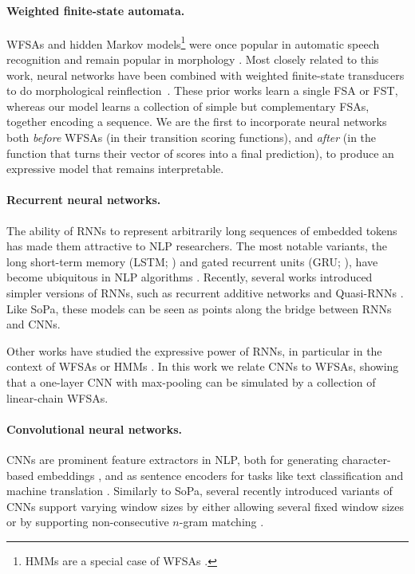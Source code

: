 \documentclass[11pt,a4paper]{article}
\renewcommand{\cite}[1]{\citep{#1}}
\newcommand{\interalia}[1]{\citep{#1}} %
\newcommand{\SoftP}{SoPa\xspace}
\begin{document}
\paragraph{Weighted finite-state automata.} WFSAs and hidden Markov models\footnote{HMMs are a special case of  WFSAs \cite{Mohri:2002}.} were once popular in
automatic speech recognition \interalia{hetherington_mit_2004,moore_juicer_2006,hoffmeister_wfst_2012} and
remain popular in morphology \interalia{dreyer_non-parametric_2011,cotterell_modeling_2015}.
Most closely related to this work, neural networks have been combined with
weighted finite-state transducers to do morphological
reinflection~\cite{rastogi_weighting_2016}.
These prior works learn a single FSA or FST, whereas our model
learns a collection of simple but complementary FSAs, together encoding a
sequence.
We are the first to incorporate neural networks both
\emph{before} WFSAs (in their transition scoring functions), and \emph{after}
(in the function that turns their vector of scores into a final prediction),
to produce an expressive model that remains interpretable.

\paragraph{Recurrent neural networks.}

The ability of RNNs to represent arbitrarily long sequences of
embedded tokens has made them attractive to NLP researchers. 
The most notable variants, the long short-term memory (LSTM; \citealp{Hochreiter:1997}) and gated recurrent units (GRU; \citealp{Cho:2014}),
have become ubiquitous in NLP algorithms \citep{Goldberg:2016}.
Recently, several works introduced simpler versions of RNNs, such as recurrent additive networks \citep{Lee:2017} and Quasi-RNNs \citep{Bradbury:2017}.
Like \SoftP, these models can be seen as points along the bridge between RNNs and CNNs.


Other works have studied the expressive power of RNNs, in particular in the context of WFSAs or HMMs \cite{Cleeremans:1989,Giles:1992,Visser:2001,Chen:2018}.
In this work we relate CNNs to WFSAs, showing that a one-layer CNN with
max-pooling can be simulated by a collection of linear-chain WFSAs.


\paragraph{Convolutional neural networks.}

CNNs are prominent feature extractors in NLP, both for generating character-based embeddings \cite{Kim:2016}, and as sentence encoders for tasks like text classification \cite{yin_multichannel_2015} and  machine translation \cite{Gehring:2017}.
Similarly to \SoftP, several recently introduced variants of CNNs support varying window sizes
by either allowing several fixed window sizes \citep{yin_multichannel_2015} or by supporting non-consecutive $n$-gram matching \cite{Lei:2015,Nguyen:2016}.
\end{document}
